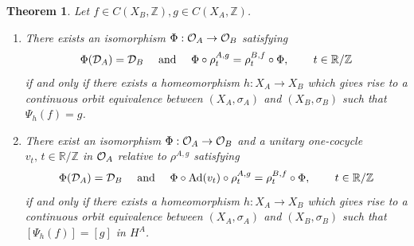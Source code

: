 \documentclass[11pt]{article}
\newtheorem{theorem}{Theorem}[section]
\theoremstyle{plain}
\theoremstyle{definition}
\numberwithin{equation}{section}
\renewcommand{\labelenumi}{\textup{(\theenumi)}}
\newcommand{\Ad}{\operatorname{Ad}}
\newcommand{\RZ}{\mathbb{R}/{\mathbb{Z}}}
\newcommand{\Z}{\mathbb{Z}}
\begin{document}
\begin{theorem} \label{thm:fg}
Let $f\in C(X_B,\Z),g \in C(X_A,\Z)$.
\begin{enumerate}
\renewcommand{\theenumi}{\roman{enumi}}
\renewcommand{\labelenumi}{\textup{(\theenumi)}}
\item
There exists an isomorphism
$\Phi:{{\mathcal{O}}_A}\rightarrow {{\mathcal{O}}_B}$ satisfying  
\begin{equation}
\Phi(\DA)=\DB
\quad
\text{ and }
\quad
\Phi\circ \rho^{A,g}_t = 
\rho^{B,f}_t\circ \Phi, \, \qquad t \in \RZ \label{eq:PhiAgBf}
\end{equation}
if and only if there exists a homeomorphism
$h: X_A\rightarrow X_B$ 
which gives rise to a continuous orbit equivalence
between $(X_A,\sigma_A)$ and $(X_B,\sigma_B)$
such that
$\Psi_h(f) =g$.
\item
There exist an 
isomorphism
$\Phi:{{\mathcal{O}}_A}\rightarrow {{\mathcal{O}}_B}$   
and
 a unitary one-cocycle 
$v_t, \, t \in \RZ$ 
in ${{\mathcal{O}}_A}$ relative to
$\rho^{A,g}$
 satisfying  
\begin{equation}
\Phi(\DA) =\DB
\quad
\text{ and }
\quad
\Phi\circ \Ad(v_t) \circ \rho^{A,g}_t 
= 
\rho^{B,f}_t\circ \Phi, \, \qquad t \in \RZ
\label{eq:cocyclePhiAgBf}
\end{equation}
if and only if there exists a homeomorphism
$h: X_A\rightarrow X_B$ 
which gives rise to a continuous orbit equivalence
between $(X_A,\sigma_A)$ and $(X_B,\sigma_B)$
such that
$[\Psi_h(f)] =[g]$ in $H^A$.
\end{enumerate}
\end{theorem}
\end{document}

